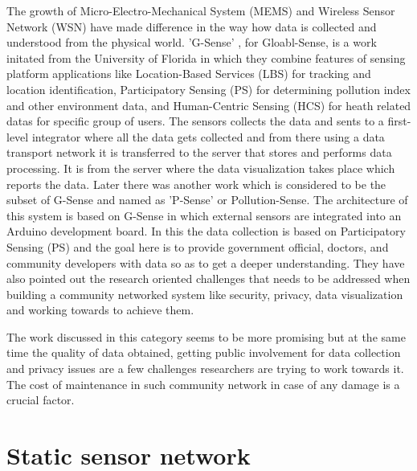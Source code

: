 \par
The growth of Micro-Electro-Mechanical System (MEMS) and Wireless Sensor Network (WSN) have made difference in the way how data is collected and understood from the physical world. 'G-Sense' \cite{Perez2010}, for Gloabl-Sense, is a work initated from the University of Florida in which they combine features of sensing platform applications like Location-Based Services (LBS) for tracking and location identification, Participatory Sensing (PS) for determining pollution index and other environment data, and Human-Centric Sensing (HCS) for heath related datas for specific group of users. The sensors collects the data and sents to a first-level integrator where all the data gets collected and from there using a data transport network it is transferred to the server that stores and performs data processing. It is from the server where the data visualization takes place which reports the data. Later there was another work which is considered to be the subset of G-Sense and named as 'P-Sense' \cite{Mendez2011} or Pollution-Sense. The architecture of this system is based on G-Sense in which external sensors are integrated into an Arduino development board. In this the data collection is based on Participatory Sensing (PS) and the goal here is to provide government official, doctors, and community developers with data so as to get a deeper understanding. They have also pointed out the research oriented challenges that needs to be addressed when building a community networked system like security, privacy, data visualization and working towards to achieve them. 

The work discussed in this category seems to be more promising but at the same time the quality of data obtained, getting public involvement for data collection and privacy issues \cite{Yi2015} are a few challenges researchers are trying to work towards it. The cost of maintenance in such community network in case of any damage is a crucial factor.



\section{Static sensor network}


